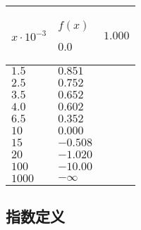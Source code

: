 \documentclass{ctexart}
\begin{document}
\begin{longtable}{|>{\centering\arraybackslash}p{2em}|>{\centering\arraybackslash}p{4em}|}

    \hline

    $x \cdot 10^{-3}$ & $f(x)$    \endhead

    \hline

    $ 0.0 $           & $1.000$            \\

    \hline

    $ 1.5 $           & $0.851$            \\

    \hline

    $ 2.5 $           & $0.752$            \\

    \hline

    $ 3.5 $           & $0.652$            \\

    \hline

    $ 4.0 $           & $0.602$            \\

    \hline

    $ 6.5 $           & $0.352$            \\

    \hline

    $ 10 $            & $0.000$            \\

    \hline

    $ 15 $            & $-0.508$           \\

    \hline

    $ 20 $            & $-1.020$           \\

    \hline

    $ 100 $           & $-10.00$           \\

    \hline

    $ 1000 $          & $-\infty$          \\

    \hline
\end{longtable}

\subsection{指数定义}
\label{sec:idxdef}
\end{document}

